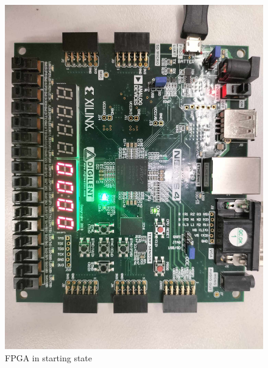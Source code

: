 \documentclass[12pt,a4paper]{article}
\begin{document}
\begin{figure}[H]
    \centering
    \includegraphics[scale=0.25]{images/fpga_start.jpg}
    \caption{FPGA in starting state}
    \label{fig:fpga_start}
\end{figure}
\end{document}
